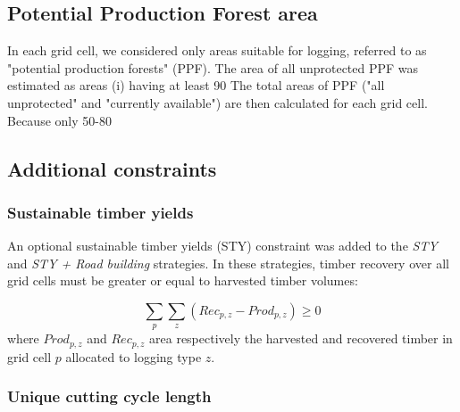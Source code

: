 \documentclass{article}
\begin{document}
\subsection{Potential Production Forest area}
\label{sec:ppf}

In each grid cell, we considered only areas suitable for logging, referred to as "potential production forests" (PPF). The area of all unprotected PPF was estimated as areas (i) having at least 90%
The total areas of PPF ("all unprotected" and "currently available") are then calculated for each grid cell. Because only 50-80%


\subsection{Additional constraints}

\subsubsection{Sustainable timber yields}

An optional sustainable timber yields (STY) constraint was added to the \textit{STY} and \textit{STY + Road building} strategies. In these strategies, timber recovery over all grid cells must be greater or equal to harvested timber volumes: 

\begin{equation}
    \sum_{p}\sum_{z} (Rec_{p,z} - Prod_{p,z}) \geq 0 
\end{equation}
where $Prod_{p,z}$ and $Rec_{p,z}$ area respectively the harvested and recovered timber in grid cell $p$ allocated to logging type $z$.

\subsubsection{Unique cutting cycle length}
\end{document}
